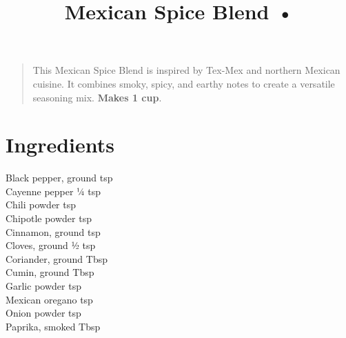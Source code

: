 \documentclass[11pt,letterpaper]{article}
\title{Mexican Spice Blend •}
\author{}
\date{}
\begin{document}
\maketitle
\thispagestyle{empty}

\begin{quote}
\small
\begin{em}
This Mexican Spice Blend is inspired by Tex-Mex and northern Mexican cuisine. It combines smoky, spicy, and earthy notes to create a versatile seasoning mix. \textbf{Makes 1 cup}.
\end{em}
\end{quote}

\section*{Ingredients}

Black pepper, ground  tsp \\
Cayenne pepper \dotfill ¼ tsp \\
Chili powder  tsp \\
Chipotle powder  tsp \\
Cinnamon, ground  tsp \\
Cloves, ground \dotfill ½ tsp \\
Coriander, ground  Tbsp \\
Cumin, ground  Tbsp \\
Garlic powder  tsp \\
Mexican oregano  tsp \\
Onion powder  tsp \\
Paprika, smoked  Tbsp
    
\end{document}

